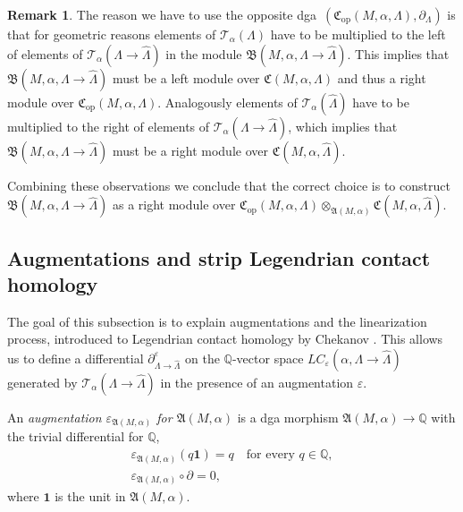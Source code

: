 \documentclass[JEP,XML,SOM,Unicode,NoFloatCountersInSection]{cedram}
\let\mathcal\mathscr
\let\epsilon\varepsilon
\let\ra\rightarrow
\newcommand{\opp}{\mathrm{op}}
\theoremstyle{plain}
\theoremstyle{definition}
\newtheorem{rmk}[thm]{Remark}
\numberwithin{equation}{subsection}
\newcommand{\QQ}{\mathbb{Q}}
\newcommand{\bdry}{\partial}
\begin{document}
\begin{rmk}
The reason we have to use the opposite dga~$(\mathfrak{C}_{\opp}(M,\alpha,\Lambda),\partial_\Lambda)$ is that for geometric reasons elements of $\mathcal{T}_\alpha(\Lambda)$ have to be multiplied to the left of elements of $\mathcal{T}_\alpha(\Lambda\ra\widehat{\Lambda})$ in the module $\mathfrak{B}(M,\alpha,\Lambda\ra\widehat{\Lambda})$. This implies that $\mathfrak{B}(M,\alpha,\Lambda\ra\widehat{\Lambda})$ must be a left module over $\mathfrak{C}(M,\alpha,{\Lambda})$ and thus a right module over $\mathfrak{C}_{\opp}(M,\alpha,{\Lambda})$.
Analogously elements of $\mathcal{T}_\alpha(\widehat{\Lambda})$ have to be multiplied to the right of elements of $\mathcal{T}_\alpha(\Lambda\ra\widehat{\Lambda})$, which implies that $\mathfrak{B}(M,\alpha,\Lambda\ra\widehat{\Lambda})$ must be a right module over $\mathfrak{C}(M,\alpha,\widehat{\Lambda})$.

Combining these observations we conclude that the correct choice is to construct $\mathfrak{B}(M,\alpha,\Lambda\ra\widehat{\Lambda})$ as a right module over $\mathfrak{C}_{\opp}(M,\alpha,\Lambda) \otimes_{\mathfrak{A}(M,\alpha)} \mathfrak{C}(M,\alpha,\widehat{\Lambda})$.
\end{rmk}

\subsection{Augmentations and strip Legendrian contact homology} \label{subsection: linearizations}

The goal of this subsection is to explain augmentations and the linearization process, introduced to Legendrian contact homology by Chekanov \cite{Ch}. This allows us to define a differential $\bdry^\epsilon_{\Lambda\ra\widehat{\Lambda}}$ on the $\mathbb{Q}$-vector space $LC_{\epsilon}(\alpha, \Lambda\ra\widehat{\Lambda})$ generated by $\mathcal{T}_\alpha(\Lambda\ra\widehat{\Lambda})$ in the presence of an augmentation $\epsilon$.

An {\em augmentation $\epsilon_{\mathfrak{A}(M,\alpha)}$ for $\mathfrak{A}(M,\alpha)$} is a dga morphism $\mathfrak{A}(M,\alpha)\to\mathbb{Q}$ with the trivial differential for $\QQ$, \ie
\begin{gather}
\epsilon_{\mathfrak{A}(M,\alpha)}(q\mathbf{1})= q \quad\mbox{for every } q \in \mathbb{Q},\\
\epsilon_{\mathfrak{A}(M,\alpha)} \circ \partial= 0,
\end{gather}
where $\mathbf{1}$ is the unit in $\mathfrak{A}(M,\alpha)$.
\end{document}
